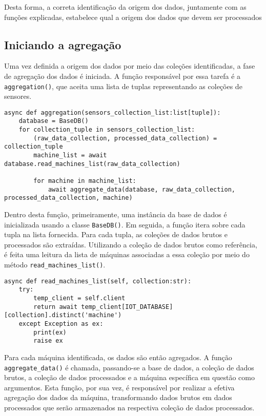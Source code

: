 Desta forma, a correta identificação da origem dos dados, juntamente com as funções explicadas, estabelece qual a origem dos dados que devem ser processados

\subsection{Iniciando a agregação}
Uma vez definida a origem dos dados por meio das coleções identificadas, a fase de agregação dos dados é iniciada. A função responsável por essa tarefa é a \texttt{aggregation()}, que aceita uma lista de tuplas representando as coleções de sensores.

\begin{verbatim}
async def aggregation(sensors_collection_list:list[tuple]):
    database = BaseDB()
    for collection_tuple in sensors_collection_list:
        (raw_data_collection, processed_data_collection) = collection_tuple
        machine_list = await database.read_machines_list(raw_data_collection)

        for machine in machine_list:
            await aggregate_data(database, raw_data_collection, processed_data_collection, machine)
\end{verbatim}

Dentro desta função, primeiramente, uma instância da base de dados é inicializada usando a classe \texttt{BaseDB()}. Em seguida, a função itera sobre cada tupla na lista fornecida. Para cada tupla, as coleções de dados brutos e processados são extraídas. Utilizando a coleção de dados brutos como referência, é feita uma leitura da lista de máquinas associadas a essa coleção por meio do método \texttt{read\_machines\_list()}.

\begin{verbatim}
async def read_machines_list(self, collection:str):
    try:
        temp_client = self.client
        return await temp_client[IOT_DATABASE][collection].distinct('machine')
    except Exception as ex:
        print(ex)
        raise ex
\end{verbatim}


Para cada máquina identificada, os dados são então agregados. A função \texttt{aggregate\_data()} é chamada, passando-se a base de dados, a coleção de dados brutos, a coleção de dados processados e a máquina específica em questão como argumentos. Esta função, por sua vez, é responsável por realizar a efetiva agregação dos dados da máquina, transformando dados brutos em dados processados que serão armazenados na respectiva coleção de dados processados.

